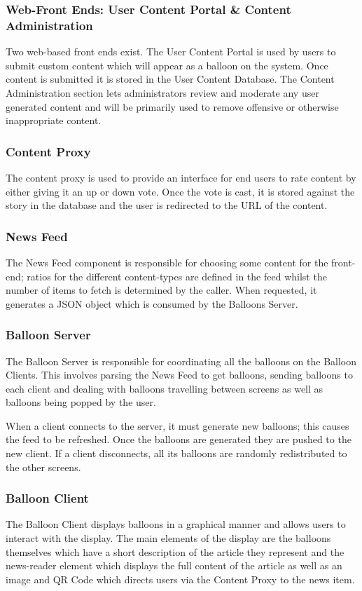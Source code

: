\subsubsection{Web-Front Ends: User Content Portal \& Content Administration}
Two web-based front ends exist. The User Content Portal is used by users to 
submit custom content which will appear as a balloon on the system. Once 
content is submitted it is stored in the User Content Database. The Content
Administration section lets administrators review and moderate any user 
generated content and will be primarily used to remove offensive or otherwise
inappropriate content.

\subsubsection{Content Proxy}
The content proxy is used to provide an interface for end users to rate content
by either giving it an up or down vote. Once the vote is cast, it is stored
against the story in the database and the user is redirected to the URL of the
content.

\subsubsection{News Feed}
The News Feed component is responsible for choosing some content for the 
front-end; ratios for the different content-types are defined in the feed 
whilst the number of items to fetch is determined by the caller. When 
requested, it generates a JSON object which is consumed by the Balloons Server.

\subsubsection{Balloon Server}
The Balloon Server is responsible for coordinating all the balloons on the 
Balloon Clients. This involves parsing the News Feed to get balloons, sending
balloons to each client and dealing with balloons travelling between screens 
as well as balloons being popped by the user. 

When a client connects to the server, it must generate new balloons; this 
causes the feed to be refreshed. Once the balloons are generated they are 
pushed to the new client. If a client disconnects, all its balloons are 
randomly redistributed to the other screens.

\subsubsection{Balloon Client}
The Balloon Client displays balloons in a graphical manner and allows users to
interact with the display. The main elements of the display are the balloons 
themselves which have a short description of the article they represent and the
news-reader element which displays the full content of the article as well as
an image and QR Code which directs users via the Content Proxy to the news item.
